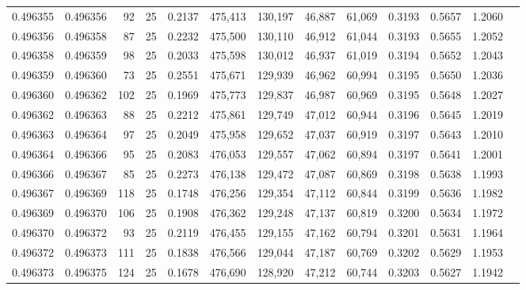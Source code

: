 \begin{tabular}{rrrrrrrrrrrrr}
0.496355 & 0.496356 &    92 &  25 &                                     0.2137 & 475,413 & 130,197 &  46,887 &  61,069 & 0.3193 & 0.5657 & 1.2060 \\
0.496356 & 0.496358 &    87 &  25 &                                     0.2232 & 475,500 & 130,110 &  46,912 &  61,044 & 0.3193 & 0.5655 & 1.2052 \\
0.496358 & 0.496359 &    98 &  25 &                                     0.2033 & 475,598 & 130,012 &  46,937 &  61,019 & 0.3194 & 0.5652 & 1.2043 \\
0.496359 & 0.496360 &    73 &  25 &                                     0.2551 & 475,671 & 129,939 &  46,962 &  60,994 & 0.3195 & 0.5650 & 1.2036 \\
0.496360 & 0.496362 &   102 &  25 &                                     0.1969 & 475,773 & 129,837 &  46,987 &  60,969 & 0.3195 & 0.5648 & 1.2027 \\
0.496362 & 0.496363 &    88 &  25 &                                     0.2212 & 475,861 & 129,749 &  47,012 &  60,944 & 0.3196 & 0.5645 & 1.2019 \\
0.496363 & 0.496364 &    97 &  25 &                                     0.2049 & 475,958 & 129,652 &  47,037 &  60,919 & 0.3197 & 0.5643 & 1.2010 \\
0.496364 & 0.496366 &    95 &  25 &                                     0.2083 & 476,053 & 129,557 &  47,062 &  60,894 & 0.3197 & 0.5641 & 1.2001 \\
0.496366 & 0.496367 &    85 &  25 &                                     0.2273 & 476,138 & 129,472 &  47,087 &  60,869 & 0.3198 & 0.5638 & 1.1993 \\
0.496367 & 0.496369 &   118 &  25 &                                     0.1748 & 476,256 & 129,354 &  47,112 &  60,844 & 0.3199 & 0.5636 & 1.1982 \\
0.496369 & 0.496370 &   106 &  25 &                                     0.1908 & 476,362 & 129,248 &  47,137 &  60,819 & 0.3200 & 0.5634 & 1.1972 \\
0.496370 & 0.496372 &    93 &  25 &                                     0.2119 & 476,455 & 129,155 &  47,162 &  60,794 & 0.3201 & 0.5631 & 1.1964 \\
0.496372 & 0.496373 &   111 &  25 &                                     0.1838 & 476,566 & 129,044 &  47,187 &  60,769 & 0.3202 & 0.5629 & 1.1953 \\
0.496373 & 0.496375 &   124 &  25 &                                     0.1678 & 476,690 & 128,920 &  47,212 &  60,744 & 0.3203 & 0.5627 & 1.1942 \\

\end{tabular}
